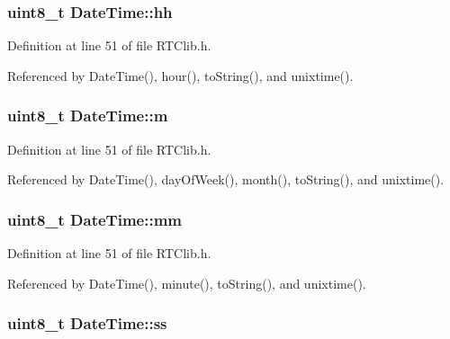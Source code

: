 \subsubsection[{\texorpdfstring{hh}{hh}}]{\setlength{\rightskip}{0pt plus 5cm}uint8\+\_\+t Date\+Time\+::hh\hspace{0.3cm}{\ttfamily [protected]}}\hypertarget{class_date_time_ad65c31b7b4bf0430311e5bdf3f343371}{}\label{class_date_time_ad65c31b7b4bf0430311e5bdf3f343371}


Definition at line 51 of file R\+T\+Clib.\+h.



Referenced by Date\+Time(), hour(), to\+String(), and unixtime().

\subsubsection[{\texorpdfstring{m}{m}}]{\setlength{\rightskip}{0pt plus 5cm}uint8\+\_\+t Date\+Time\+::m\hspace{0.3cm}{\ttfamily [protected]}}\hypertarget{class_date_time_a04c79ec05511462bc6a015e5b1088609}{}\label{class_date_time_a04c79ec05511462bc6a015e5b1088609}


Definition at line 51 of file R\+T\+Clib.\+h.



Referenced by Date\+Time(), day\+Of\+Week(), month(), to\+String(), and unixtime().

\subsubsection[{\texorpdfstring{mm}{mm}}]{\setlength{\rightskip}{0pt plus 5cm}uint8\+\_\+t Date\+Time\+::mm\hspace{0.3cm}{\ttfamily [protected]}}\hypertarget{class_date_time_af2cbffff9349832135c3280a18d21510}{}\label{class_date_time_af2cbffff9349832135c3280a18d21510}


Definition at line 51 of file R\+T\+Clib.\+h.



Referenced by Date\+Time(), minute(), to\+String(), and unixtime().

\subsubsection[{\texorpdfstring{ss}{ss}}]{\setlength{\rightskip}{0pt plus 5cm}uint8\+\_\+t Date\+Time\+::ss\hspace{0.3cm}{\ttfamily [protected]}}\hypertarget{class_date_time_a38da3481e6355fcf8ceb4c57eb9db0ce}{}\label{class_date_time_a38da3481e6355fcf8ceb4c57eb9db0ce}


